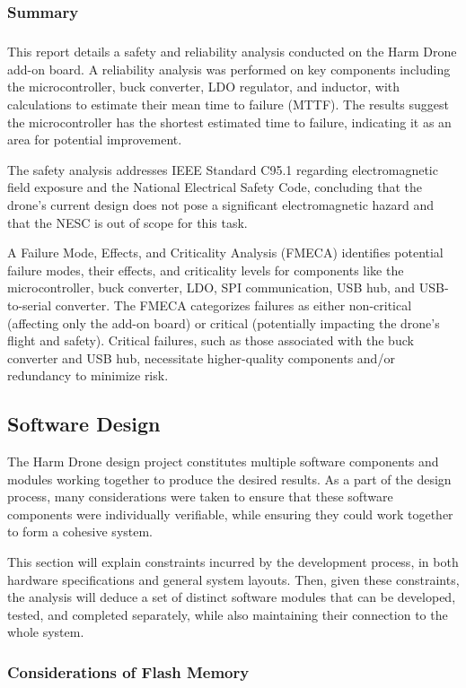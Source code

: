 \documentclass[12pt]{article}
\begin{document}
\subsubsection{Summary}
\subparagraph{} This report details a safety and reliability analysis conducted on the Harm Drone add-on board. A reliability analysis was performed on key components including the microcontroller, buck converter, LDO regulator, and inductor, with calculations to estimate their mean time to failure (MTTF). The results suggest the microcontroller has the shortest estimated time to failure, indicating it as an area for potential improvement. 
\par The safety analysis addresses IEEE Standard C95.1 regarding electromagnetic field exposure and the National Electrical Safety Code, concluding that the drone's current design does not pose a significant electromagnetic hazard and that the NESC is out of scope for this task. 
\par A Failure Mode, Effects, and Criticality Analysis (FMECA) identifies potential failure modes, their effects, and criticality levels for components like the microcontroller, buck converter, LDO, SPI communication, USB hub, and USB-to-serial converter. The FMECA categorizes failures as either non-critical (affecting only the add-on board) or critical (potentially impacting the drone's flight and safety). Critical failures, such as those associated with the buck converter and USB hub, necessitate higher-quality components and/or redundancy to minimize risk.
\subsection{Software Design}
\par The Harm Drone design project constitutes multiple software components and modules working together to produce the desired results. As a part of the design process, many considerations were taken to ensure that these software components were individually verifiable, while ensuring they could work together to form a cohesive system.
\par This section will explain constraints incurred by the development process, in both hardware specifications and general system layouts. Then, given these constraints, the analysis will deduce a set of distinct software modules that can be developed, tested, and completed separately, while also maintaining their connection to the whole system.
\subsubsection{Considerations of Flash Memory}
\end{document}
